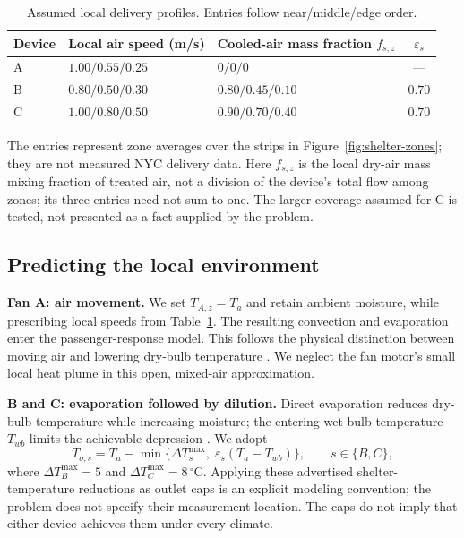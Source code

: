\documentclass[12pt]{article}
\begin{document}
\begin{table}[!ht]
\centering\small
\caption{Assumed local delivery profiles. Entries follow near/middle/edge order.}
\label{tab:bus-fields}
\begin{tabularx}{\linewidth}{@{}lXXc@{}}
\toprule
Device & Local air speed (m/s) & Cooled-air mass fraction $f_{s,z}$ & $\varepsilon_s$\\
\midrule
A & $1.00 / 0.55 / 0.25$ & $0 / 0 / 0$ & ---\\
B & $0.80 / 0.50 / 0.30$ & $0.80 / 0.45 / 0.10$ & $0.70$\\
C & $1.00 / 0.80 / 0.50$ & $0.90 / 0.70 / 0.40$ & $0.70$\\
\bottomrule
\end{tabularx}
\end{table}

The entries represent zone averages over the strips in Figure~\ref{fig:shelter-zones}; they are not measured NYC delivery data. Here $f_{s,z}$ is the local dry-air mass mixing fraction of treated air, not a division of the device's total flow among zones; its three entries need not sum to one. The larger coverage assumed for C is tested, not presented as a fact supplied by the problem.

\subsection{Predicting the local environment}

\noindent\textbf{Fan A: air movement.} We set $T_{A,z}=T_a$ and retain ambient moisture, while prescribing local speeds from Table~\ref{tab:bus-fields}. The resulting convection and evaporation enter the passenger-response model. This follows the physical distinction between moving air and lowering dry-bulb temperature \cite{fanguide}. We neglect the fan motor's small local heat plume in this open, mixed-air approximation.

\noindent\textbf{B and C: evaporation followed by dilution.} Direct evaporation reduces dry-bulb temperature while increasing moisture; the entering wet-bulb temperature $T_{wb}$ limits the achievable depression \cite{evapequip}. We adopt
\begin{equation}
 T_{o,s}=T_a-\min\{\Delta T_s^{\max},\;\varepsilon_s(T_a-T_{wb})\},
 \qquad s\in\{B,C\},
\label{eq:outlet}
\end{equation}
where $\Delta T_B^{\max}=5$ and $\Delta T_C^{\max}=8\,^{\circ}\mathrm C$. Applying these advertised shelter-temperature reductions as outlet caps is an explicit modeling convention; the problem does not specify their measurement location. The caps do not imply that either device achieves them under every climate.
\end{document}
